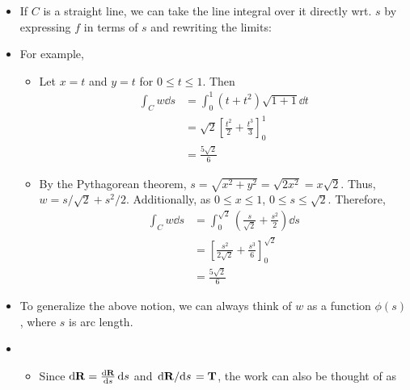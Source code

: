 \documentclass[../main.tex]{subfiles}
\begin{document}
\begin{itemize}
    \item If $C$ is a straight line, we can take the line integral over it directly wrt. $s$ by expressing $f$ in terms of $s$ and rewriting the limits:
    \item For example, 
    \begin{itemize}
        \item Let $x=t$ and $y=t$ for $0\leq t\leq 1$. Then
        \begin{align*}
            \int_Cw\dd{s} &= \int_0^1(t+t^2)\sqrt{1+1}\dd{t}\\
            &= \sqrt{2}\left[ \frac{t^2}{2}+\frac{t^3}{3} \right]_0^1\\
            &= \frac{5\sqrt{2}}{6}
        \end{align*}
        \item By the Pythagorean theorem, $s=\sqrt{x^2+y^2}=\sqrt{2x^2}=x\sqrt{2}$. Thus, $w=s/\sqrt{2}+s^2/2$. Additionally, as $0\leq x\leq 1$, $0\leq s\leq\sqrt{2}$. Therefore,
        \begin{align*}
            \int_Cw\dd{s} &= \int_0^{\sqrt{2}}\left( \frac{s}{\sqrt{2}}+\frac{s^2}{2} \right)\dd{s}\\
            &= \left[ \frac{s^2}{2\sqrt{2}}+\frac{s^3}{6} \right]_0^{\sqrt{2}}\\
            &= \frac{5\sqrt{2}}{6}
        \end{align*}
    \end{itemize}
    \item To generalize the above notion, we can always think of $w$ as a function $\phi(s)$, where $s$ is arc length.
    \item {}
    \begin{itemize}
        \item Since $\dd{\mathbf{R}}=\dv{\mathbf{R}}{s}\dd{s}$ and $\dv*{\mathbf{R}}{s}=\mathbf{T}$, the work can also be thought of as 

\end{itemize}
\end{itemize}
\end{document}
